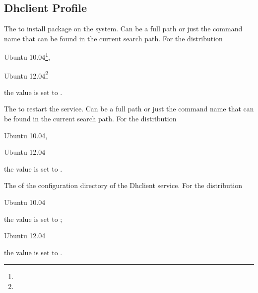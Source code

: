 \label{sec:dhclient_profile}
\subsection{Dhclient Profile}


The  to install package on the system. Can be a full path or
just the command name that can be found in the current search path. 
For the distribution
\begin{inparaitem}
\item[\TheDistribution{ubuntu}] Ubuntu 10.04\footnote{\TheUbuntuMaverickLTSDate},
\item[\TheDistribution{ubuntu}] Ubuntu 12.04\footnote{\TheUbuntuPreciseLTSDate}
\end{inparaitem}
the value is set to .


The  to restart the service. Can be a full path or
just the command name that can be found in the current search path. 
For the distribution
\begin{inparaitem}
\item[\TheDistribution{ubuntu}] Ubuntu 10.04,
\item[\TheDistribution{ubuntu}] Ubuntu 12.04
\end{inparaitem}
the value is set to .


The  of the configuration directory of the Dhclient service. 
For the distribution
\begin{inparaitem}
\item[\TheDistribution{ubuntu}] Ubuntu 10.04
\end{inparaitem}
the value is set to ;
\begin{inparaitem}
\item[\TheDistribution{ubuntu}] Ubuntu 12.04
\end{inparaitem}
the value is set to .

